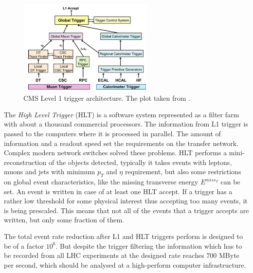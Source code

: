 \begin{figure}[t]
  \centering
  \includegraphics[width=0.6\textwidth]{02_experimental_setup/plots/img_l1.png}
  \caption{CMS Level 1 trigger architecture. The plot taken from \cite{CMSatLHC}.}
  \label{fig:trigA}
\end{figure}

The \textit{High Level Trigger} (HLT) is a software system represented as a filter farm with about a thousand commercial processors. The information
from L1 trigger is passed to the computers where it is processed in parallel. The amount of information and a readout speed set the requirements
on the transfer network. Complex modern network switches solved these problems. HLT performs a mini-reconstruction of the objects detected,
typically it takes events with leptons, muons and jets with minimum $p_{T}$ and $\eta$ requirement, but also some restrictions on global
event characteristics, like the missing transverse energy $E^{miss_{T}}$ can be set. An event is written in case of at least one HLT accept.
If a trigger has a rather low threshold for some physical interest thus accepting too many events, it is being prescaled. This means that not 
all of the events that a trigger accepts are written, but only some fraction of them.

The total event rate reduction after L1 and HLT triggers perform is designed to be of a factor $10^{6}$. But despite the trigger filtering
the information which has to be recorded from all LHC experiments at the designed rate reaches 700 MByte per second, which should be analysed 
at a high-perform computer infrastructure\cite{CMScompTDR}.
% 
